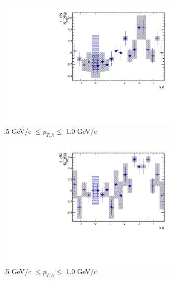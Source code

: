 \begin{figure}[htbp]
	\begin{subfigure}{0.5\textwidth}
		\includegraphics[width=.9\textwidth]{Plots/Correlations/EP/subtracted/NPE_subtracted_eh_corr_inplane_primpt_4_5_cent_2_5_assopt_1_1.pdf}
		\caption{.5 GeV/c $\leq p_{T,h} \leq$ 1.0 GeV/c}
		\label{fig:EP_corr_subtracted_a}
	\end{subfigure}	
	\begin{subfigure}{0.5\textwidth}
		\includegraphics[width=.9\textwidth]{Plots/Correlations/EP/subtracted/NPE_subtracted_eh_corr_outplane_primpt_4_5_cent_2_5_assopt_1_1.pdf}
		\caption{.5 GeV/c $\leq p_{T,h} \leq$ 1.0 GeV/c}
		\label{fig:EP_corr_subtracted_b}
	\end{subfigure}	
	\begin{subfigure}{0.5\textwidth}

\end{subfigure}
\end{figure}
